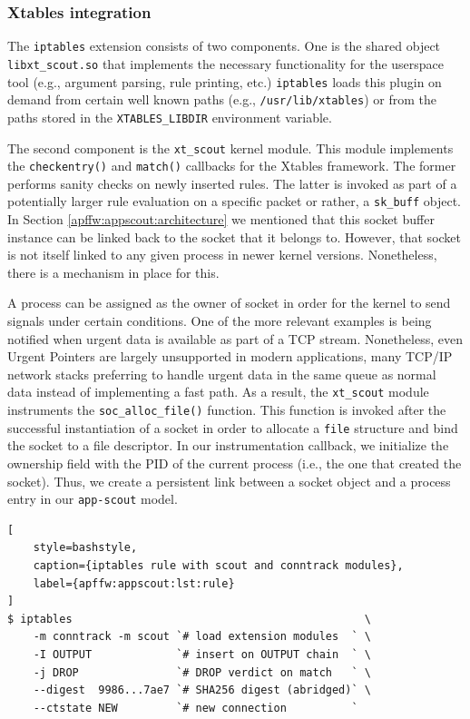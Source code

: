 \subsubsection{Xtables integration}

The \texttt{iptables} extension consists of two components. One is the shared
object \texttt{libxt\_scout.so} that implements the necessary functionality for
the userspace tool (e.g., argument parsing, rule printing, etc.)
\texttt{iptables} loads this plugin on demand from certain well known paths
(e.g., \texttt{/usr/lib/xtables}) or from the paths stored in the
\texttt{XTABLES\_LIBDIR} environment variable.

The second component is the \texttt{xt\_scout} kernel module. This module
implements the \texttt{checkentry()} and \texttt{match()} callbacks for the
Xtables framework. The former performs sanity checks on newly inserted rules.
The latter is invoked as part of a potentially larger rule evaluation on a
specific packet or rather, a \texttt{sk\_buff} object. In Section
\ref{apffw:appscout:architecture} we mentioned that this socket buffer instance can be
linked back to the socket that it belongs to. However, that socket is not itself
linked to any given process in newer kernel versions. Nonetheless, there is a
mechanism in place for this.

A process can be assigned as the owner of socket in order for the kernel to send
signals under certain conditions. One of the more relevant examples is being
notified when urgent data is available as part of a TCP stream. Nonetheless,
even Urgent Pointers are largely unsupported in modern applications, many TCP/IP
network stacks preferring to handle urgent data in the same queue as normal data
instead of implementing a fast path. As a result, the \texttt{xt\_scout} module
instruments the \texttt{soc\_alloc\_file()} function. This function is invoked
after the successful instantiation of a socket in order to allocate a
\texttt{file} structure and bind the socket to a file descriptor. In our
instrumentation callback, we initialize the ownership field with the PID of the
current process (i.e., the one that created the socket). Thus, we create a
persistent link between a socket object and a process entry in our
\texttt{app-scout} model.

\begin{lstlisting}[
    style=bashstyle,
    caption={iptables rule with scout and conntrack modules},
    label={apffw:appscout:lst:rule}
]
$ iptables                                             \
    -m conntrack -m scout `# load extension modules  ` \
    -I OUTPUT             `# insert on OUTPUT chain  ` \
    -j DROP               `# DROP verdict on match   ` \
    --digest  9986...7ae7 `# SHA256 digest (abridged)` \
    --ctstate NEW         `# new connection          `
\end{lstlisting}


